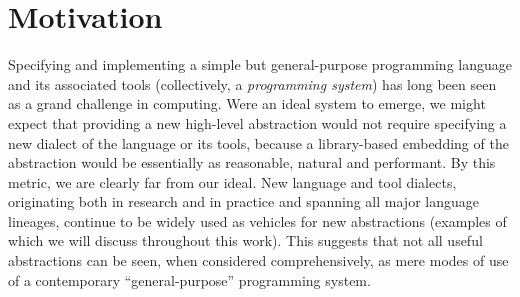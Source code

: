 \vspace{-25pt}
\section{Motivation}\label{motivation}
Specifying and implementing a simple but general-purpose programming language and its associated tools (collectively, a \emph{programming system}) has long been seen as a grand challenge in computing. Were an ideal system to emerge, we might expect that providing a new high-level abstraction would not require specifying a new dialect of the language or its tools, because a library-based embedding of the abstraction would be essentially as reasonable, natural and performant. By this metric, we are clearly far from our ideal. New language and tool dialects, originating both in research and in practice and spanning all major language lineages, continue to be widely used as vehicles for new abstractions (examples of which we will discuss throughout this work). This suggests that not all useful  abstractions can be seen, when considered comprehensively, as mere modes of use of a contemporary ``general-purpose'' programming system.%


